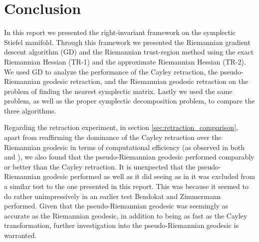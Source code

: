 \section{Conclusion}\label{sec:Conclusion}
In this report we presented the right-invariant framework on the symplectic Stiefel manifold. Through this framework we presented the Riemannian gradient descent algorithm (GD) and the Riemannian trust-region method using the exact Riemannian Hessian (TR-1) and the approximate Riemannian Hessian (TR-2). We used GD to analyze the performance of the Cayley retraction, the pseudo-Riemannian geodesic retraction, and the Riemannian geodesic retraction on the problem of finding the nearest symplectic matrix. Lastly we used the same problem, as well as the proper symplectic decomposition problem, to compare the three algorithms. 

Regarding the retraction experiment, in section \ref{sec:retraction_comparison}, apart from reaffirming the dominance of the Cayley retraction over the Riemannian geodesic in terms of computational efficiency (as observed in both \cite[p.~8]{JensenZimmermann2024} and \cite[p.~26]{BendokatZimmermann2021}), we also found that the pseudo-Riemannian geodesic performed comparably or better than the Cayley retraction. It is unexpected that the pseudo-Riemannian geodesic performed as well as it did seeing as in \cite[p.~28]{BendokatZimmermann2021} it was excluded from a similar test to the one presented in this report. This was because it seemed to do rather unimpressively in an earlier test Bendokat and Zimmermann performed. Given that the pseudo-Riemannian geodesic was seemingly as accurate as the Riemannian geodesic, in addition to being as fast as the Cayley transformation, further investigation into the pseudo-Riemannian geodesic is warranted. 

